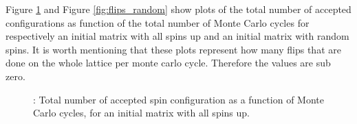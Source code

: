 \documentclass{article}
\begin{document}
{{		Figure \ref{fig:flips} and Figure \ref{fig:flips_random} show plots of the total number of accepted configurations as function of the total number of Monte Carlo cycles for respectively an initial matrix with all spins up and an initial matrix with random spins. It is worth mentioning that these plots represent how many flips that are done on the whole lattice per monte carlo cycle. Therefore the values are sub zero.

		\begin{figure}[H]
		\caption{: Total number of accepted spin configuration as a function of Monte Carlo cycles, for an initial matrix with all spins up. }
		\label{fig:flips}
		\end{figure}

}}
\end{document}
